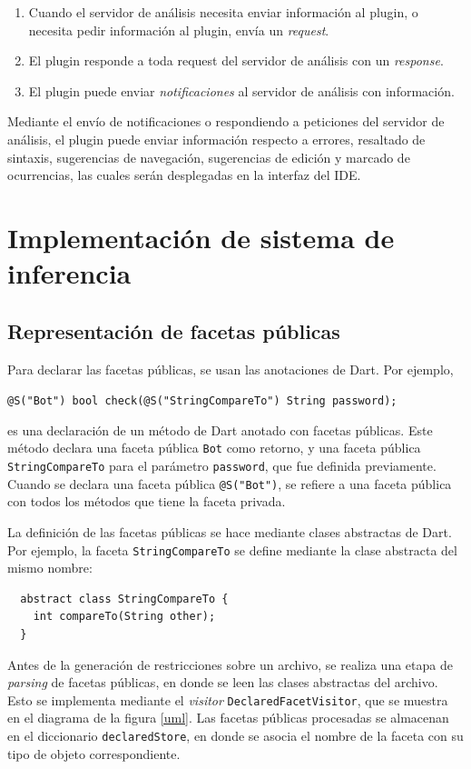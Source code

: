 \begin{enumerate}
  \item Cuando el servidor de análisis necesita enviar información al plugin, o necesita pedir información al plugin, envía un \emph{request}.
  \item El plugin responde a toda request del servidor de análisis con un \emph{response}.
  \item El plugin puede enviar \emph{notificaciones} al servidor de análisis con información.
\end{enumerate}

Mediante el envío de notificaciones o respondiendo a peticiones del servidor de análisis, el plugin puede enviar información respecto a errores, resaltado de sintaxis, sugerencias de navegación, sugerencias de edición y marcado de ocurrencias, las cuales serán desplegadas en la interfaz del IDE.

\section{Implementación de sistema de inferencia}

\subsection{Representación de facetas públicas}
Para declarar las facetas públicas, se usan las anotaciones de Dart. Por ejemplo,

 \texttt{@S("Bot") bool check(@S("StringCompareTo") String password);}

 es una declaración de un método de Dart anotado con facetas públicas. Este método declara una faceta pública \texttt{Bot} como retorno, y una faceta pública \texttt{StringCompareTo} para el parámetro \texttt{password}, que fue definida previamente. Cuando se declara una faceta pública \texttt{@S("Bot")}, se refiere a una faceta pública con todos los métodos que tiene la faceta privada.

La definición de las facetas públicas se hace mediante clases abstractas de Dart. Por ejemplo, la faceta \texttt{StringCompareTo} se define mediante la clase abstracta del mismo nombre:
\vspace{0.5em}
\begin{lstlisting}
  abstract class StringCompareTo {
    int compareTo(String other);
  }
\end{lstlisting}

Antes de la generación de restricciones sobre un archivo, se realiza una etapa de \textit{parsing} de facetas públicas, en donde se leen las clases abstractas del archivo. Esto se implementa mediante el \emph{visitor} \texttt{DeclaredFacetVisitor}, que se muestra en el diagrama de la figura \ref{uml}. Las facetas públicas procesadas se almacenan en el diccionario \texttt{declaredStore}, en donde se asocia el nombre de la faceta con su tipo de objeto correspondiente.

